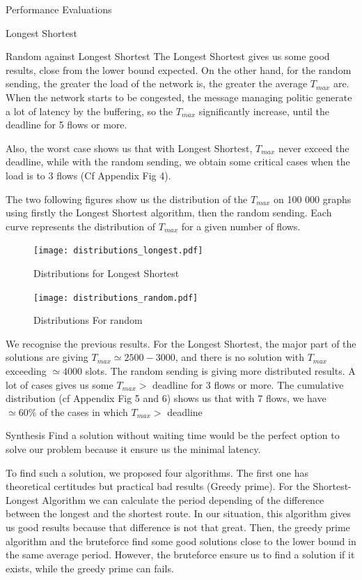 \documentclass[a4paper,10pt]{report}
\begin{document}
\begin{chapter}{Performance Evaluations}
\begin{section}{Longest Shortest}
\begin{subsection}{Random against Longest Shortest}
The Longest Shortest gives us some good results, close from the lower bound expected. On the other hand, for the random sending, 
the greater the load of the network is, the greater the average $T_{max}$ are. When the network starts to be congested, the 
message managing politic generate a lot of latency by the buffering, so the $T_{max}$ significantly increase, until the deadline for 5 flows or more.


Also, the worst case shows us that with Longest Shortest, $T_{max}$ never exceed the deadline, while with the random sending, we obtain some
critical cases when the load is to 3 flows (Cf Appendix Fig 4).


The two following figures show us the distribution of the $T_{max}$ on 100 000 graphs using firstly the Longest Shortest algorithm, then the
random sending.
Each curve represents the distribution of $T_{max}$ for a given number of flows.
\begin{figure}[H]
\hspace*{-4cm}
\centering
\texttt{[image: distributions\_longest.pdf]}%
\caption{Distributions for Longest Shortest}
\end{figure}

\begin{figure}[H]
\hspace*{-3cm}
\centering
\texttt{[image: distributions\_random.pdf]}%
\caption{Distributions For random}
\end{figure}

We recognise the previous results. For the Longest Shortest, the major part of the solutions are giving $T_{max} \simeq 2500-3000$, and there is no
solution with $T_{max}$ exceeding $\simeq 4000$ slots.
The random sending is giving more distributed results. A lot of cases gives us some $T_{max} >$ deadline for 3 flows or more.
The cumulative distribution (cf Appendix Fig 5 and 6) shows us that with 7 flows, we have $\simeq 60\%$ of the cases in which $T_{max} >$ deadline


\end{subsection}

\end{section}

\begin{section}{Synthesis}
Find a solution without waiting time would be the perfect option to solve our problem because it ensure us the minimal latency.

To find such a solution, we proposed four algorithms. The first one has theoretical certitudes but practical bad results (Greedy prime).
For the Shortest-Longest Algorithm we can calculate the period depending of the difference between the longest and the shortest route.
In our situation, this algorithm gives us good results because that difference is not that great.
Then, the greedy prime algorithm and the bruteforce find some good solutions close to the lower bound in the same average period.
However, the bruteforce ensure us to find a solution if it exists, while the greedy prime can fails.


\end{section}
\end{chapter}
\end{document}
